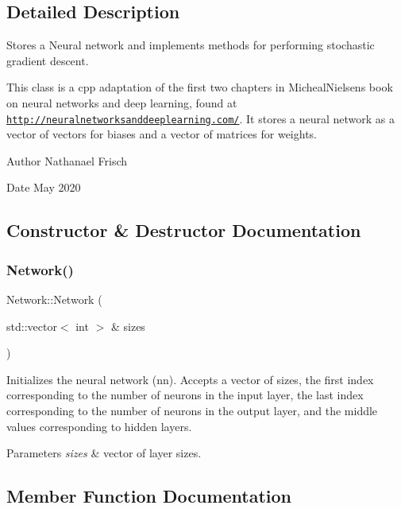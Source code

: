 \subsection{Detailed Description}
Stores a Neural network and implements methods for performing stochastic gradient descent. 

This class is a cpp adaptation of the first two chapters in Micheal\+Nielsen\textquotesingle{}s book on neural networks and deep learning, found at \href{http://neuralnetworksanddeeplearning.com/}{\tt http\+://neuralnetworksanddeeplearning.\+com/}. It stores a neural network as a vector of vectors for biases and a vector of matrices for weights.

\begin{DoxyAuthor}{Author}
Nathanael Frisch 
\end{DoxyAuthor}
\begin{DoxyDate}{Date}
May 2020 
\end{DoxyDate}


\subsection{Constructor \& Destructor Documentation}
\mbox{\label{classNetwork_aa6382995a4a0bc915d12d794eb584adf}} 
\subsubsection{\texorpdfstring{Network()}{Network()}}
{\footnotesize\ttfamily Network\+::\+Network (\begin{DoxyParamCaption}\item[{std\+::vector$<$ int $>$ \&}]{sizes }\end{DoxyParamCaption})}

Initializes the neural network (nn). Accepts a vector of sizes, the first index corresponding to the number of neurons in the input layer, the last index corresponding to the number of neurons in the output layer, and the middle values corresponding to hidden layers.


\begin{DoxyParams}{Parameters}
{\em sizes} & vector of layer sizes. \\
\hline
\end{DoxyParams}


\subsection{Member Function Documentation}
\mbox{\label{classNetwork_a657a8db0aad5e948118f188b19d8584c}} 
